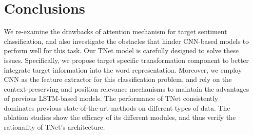 \documentclass[11pt,a4paper]{article}
\begin{document}
\section{Conclusions}
We re-examine the drawbacks of attention mechanism for target sentiment classification, and also investigate the obstacles that hinder CNN-based models to perform well for this task. Our TNet model is carefully designed to solve these issues. Specifically, we propose target specific transformation component to better integrate target information into the word representation. Moreover, we employ CNN as the feature extractor for this classification problem, and rely on the context-preserving and position relevance mechanisms to maintain the advantages of previous LSTM-based models. The performance of TNet consistently dominates previous state-of-the-art methods on different types of data. 
The ablation studies show the efficacy of its different modules, and thus verify the rationality of TNet's architecture.



\end{document}
